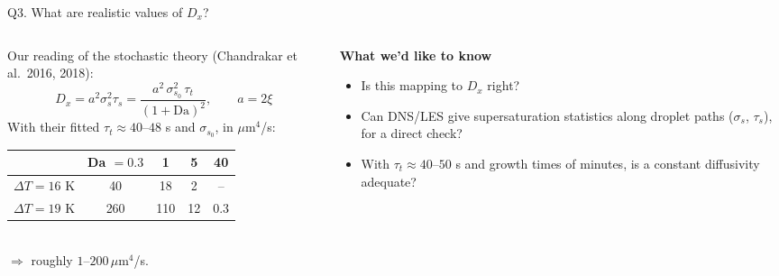 \documentclass[aspectratio=169,10pt]{beamer}
\newcommand{\um}{\,\mu\mathrm{m}}
\newcommand{\ask}[1]{\textcolor{askcol}{\textbf{#1}}}
\begin{document}
\begin{frame}{Q3. What are realistic values of $D_x$?}
\begin{columns}[T]
\begin{column}{0.52\textwidth}
Our reading of the stochastic theory (Chandrakar et al.\ 2016, 2018):
\[
D_x = a^2\sigma_s^2\tau_s = \frac{a^2\,\sigma_{s_0}^2\,\tau_t}{(1+\mathrm{Da})^2},\qquad a = 2\xi
\]
With their fitted $\tau_t\approx40$--$48$ s and $\sigma_{s_0}$, in $\mu$m$^4$/s:\\[0.3em]
\begin{tabular}{@{}lcccc@{}}
\toprule
& Da $=0.3$ & 1 & 5 & 40\\\midrule
$\Delta T = 16$ K & 40 & 18 & 2 & --\\
$\Delta T = 19$ K & 260 & 110 & 12 & 0.3\\\bottomrule
\end{tabular}\\[0.3em]
$\Rightarrow$ roughly $1$--$200\um^4$/s.
\end{column}
\begin{column}{0.46\textwidth}
\ask{What we'd like to know}
\begin{itemize}
\item Is this mapping to $D_x$ right?
\item Can DNS/LES give supersaturation statistics along droplet paths ($\sigma_s$, $\tau_s$), for a direct check?
\item With $\tau_t\approx40$--$50$ s and growth times of minutes, is a constant diffusivity adequate?
\end{itemize}
\end{column}
\end{columns}
\end{frame}
\end{document}
